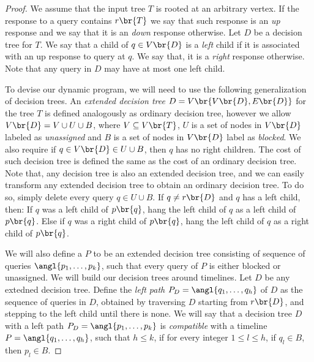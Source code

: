 \begin{theorem}
\begin{proof}
We assume that the input tree $T$ is rooted at an arbitrary vertex. If the response to a query contains $r\br{T}$ we say that such response is an \textit{up} response and we say that it is an \textit{down} response otherwise. Let $D$ be a decision tree for $T$. We say that a child of $q\in V\br{D}$ is a \textit{left} child if it is associated with an up response to query at $q$. We say that, it is a \textit{right} response otherwise. Note that any query in $D$ may have at most one left child.

To devise our dynamic program, we will need to use the following generalization of decision trees. An \textit{extended decision tree} $D=V\br{V\br{D}, E\br{D}}$ for the tree $T$ is defined analogously as ordinary decision tree, however we allow $V\br{D}=V\cup U \cup B$, where $V\subseteq V\br{T}$, $U$ is a set of nodes in $V\br{D}$ labeled as \textit{unassigned} and $B$ is a set of nodes in $V\br{D}$ label as \textit{blocked}. We also require if $q\in V\br{D}\in U\cup B$, then $q$ has no right children. The cost of such decision tree is defined the same as the cost of an ordinary decision tree. Note that, any decision tree is also an extended decision tree, and we can easily transform any extended decision tree to obtain an ordinary decision tree. To do so, simply delete every query $q\in U\cup B$. If $q\neq r\br{D}$ and $q$ has a left child, then: If $q$ was a left child of $p\br{q}$, hang the left child of $q$ as a left child of $p\br{q}$. Else if $q$ was a right child of $p\br{q}$, hang the left child of $q$ as a right child of $p\br{q}$.

We will also define a  $P$ to be an extended decision tree consisting of sequence of queries $\angl{p_1,\dots,p_k}$, such that every query of $P$ is either blocked or unassigned. We will build our decision trees around timelines. Let $D$ be any extedned decision tree. Define the \textit{left path} $P_D=\angl{q_1,\dots,q_h}$ of $D$ as the sequence of queries in $D$, obtained by traversing $D$ starting from $r\br{D}$, and stepping to the left child until there is none. We will say that a decision tree $D$ with a left path $P_D=\angl{p_1,\dots,p_k}$ is \textit{compatible} with a timeline $P=\angl{q_1,\dots,q_h}$, such that $h\leq k$, if for every integer $1\leq l \leq h$, if $q_l\in B$, then $p_l\in B$. 


\end{proof}
\end{theorem}
